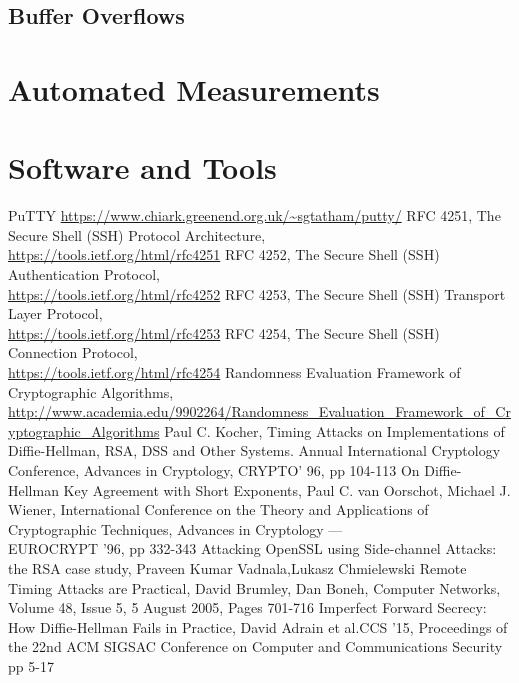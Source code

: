 \documentclass{report}
\begin{document}
\section{Buffer Overflows}
\begin{appendices}
\chapter{Automated Measurements}
\chapter{Software and Tools}
\end{appendices}
\begin{thebibliography}{9}
PuTTY
\url{https://www.chiark.greenend.org.uk/~sgtatham/putty/}
RFC 4251, The Secure Shell (SSH) Protocol Architecture,\\
\url{https://tools.ietf.org/html/rfc4251}
RFC 4252, The Secure Shell (SSH) Authentication Protocol,\\  \url{https://tools.ietf.org/html/rfc4252}
RFC 4253, The Secure Shell (SSH) Transport Layer Protocol,\\ \url{https://tools.ietf.org/html/rfc4253}
RFC 4254, The Secure Shell (SSH) Connection Protocol,\\ \url{https://tools.ietf.org/html/rfc4254}
Randomness Evaluation Framework of Cryptographic Algorithms,\\
\url{http://www.academia.edu/9902264/Randomness_Evaluation_Framework_of_Cryptographic_Algorithms}
Paul C. Kocher, Timing Attacks on Implementations of Diffie-Hellman, RSA, DSS  and Other Systems. Annual International Cryptology Conference, Advances in Cryptology, CRYPTO' 96, pp 104-113
On Diffie-Hellman Key Agreement with Short Exponents, Paul C. van Oorschot, Michael J. Wiener, International Conference on the Theory and Applications of Cryptographic Techniques, Advances in Cryptology — \\EUROCRYPT '96, pp 332-343
Attacking OpenSSL using Side-channel Attacks: the RSA case study, Praveen Kumar Vadnala,Lukasz Chmielewski
Remote Timing Attacks are Practical, David Brumley, Dan Boneh, Computer Networks, Volume 48, Issue 5, 5 August 2005, Pages 701-716
Imperfect Forward Secrecy: How Diffie-Hellman Fails in Practice, David Adrain et al.CCS '15, Proceedings of the 22nd ACM SIGSAC Conference on Computer and Communications Security
pp 5-17
\end{thebibliography}
\listoffigures
\end{document}
